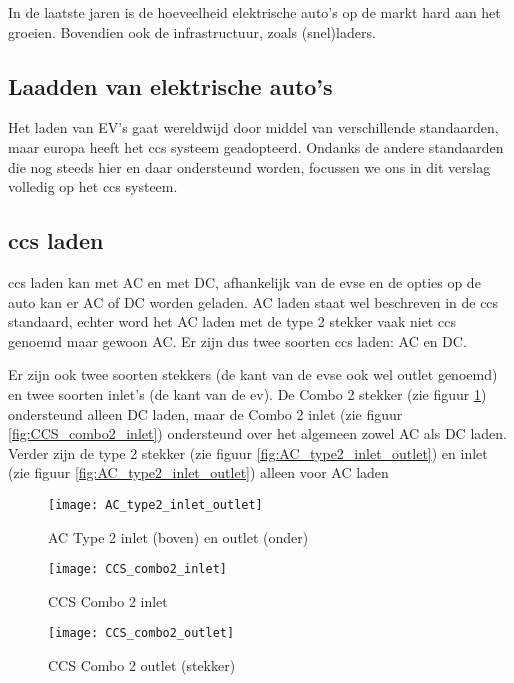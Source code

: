 In de laatste jaren is de hoeveelheid elektrische auto's op de markt hard aan
het groeien. Bovendien ook de infrastructuur, zoals (snel)laders. 

\subsection{Laadden van elektrische auto's}

Het laden van EV's gaat wereldwijd door middel van verschillende standaarden,
maar europa heeft het \ac{ccs} systeem geadopteerd. Ondanks de andere
standaarden die nog steeds hier en daar ondersteund worden, focussen we ons in
dit verslag volledig op het \ac{ccs} systeem.

\subsection{\ac{ccs} laden}

\ac{ccs} laden kan met AC en met DC, afhankelijk van de \ac{evse} en de opties
op de auto kan er AC of DC worden geladen. AC laden staat wel beschreven in de
\ac{ccs} standaard, echter word het AC laden met de type 2 stekker vaak niet
\ac{ccs} genoemd maar gewoon AC. Er zijn dus twee soorten \ac{ccs} laden: AC en
DC.

Er zijn ook twee soorten stekkers (de kant van de \ac{evse} ook wel outlet
genoemd) en twee soorten inlet's (de kant van de \ac{ev}). De Combo 2 stekker
(zie figuur \ref{fig:CCS_combo2_outlet}) ondersteund alleen DC laden, maar de
Combo 2 inlet (zie figuur \ref{fig:CCS_combo2_inlet}) ondersteund over het
algemeen zowel AC als DC laden. Verder zijn de type 2 stekker (zie figuur
\ref{fig:AC_type2_inlet_outlet}) en inlet (zie figuur
\ref{fig:AC_type2_inlet_outlet}) alleen voor AC laden

\begin{figure}[h]
    \centering
    \begin{minipage}{0.45\textwidth}
        \centerline{\texttt{[image: AC\_type2\_inlet\_outlet]}}
        \caption{AC Type 2 inlet (boven) en outlet (onder)}
        \label{fig:AC_type2_inlet_outlet}
    \end{minipage}\hfill
    \begin{minipage}{0.45\textwidth}
        \centerline{\texttt{[image: CCS\_combo2\_inlet]}}
        \caption{CCS Combo 2 inlet}
        \label{fig:CCS_combo2_inlet}
        \hfill
        \centerline{\texttt{[image: CCS\_combo2\_outlet]}}
        \caption{CCS Combo 2 outlet (stekker)}
        \label{fig:CCS_combo2_outlet}
    \end{minipage}
\end{figure}

